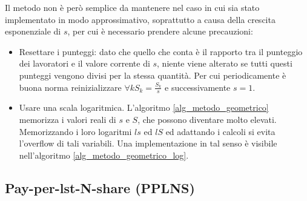 Il metodo non è però semplice da mantenere nel caso in cui sia stato implementato in modo approssimativo, soprattutto a causa della crescita esponenziale di $s$, per cui è necessario prendere alcune precauzioni:
\begin{itemize}
    \item Resettare i punteggi: dato che quello che conta è il rapporto tra il punteggio dei lavoratori e il valore corrente di $s$, niente viene alterato se tutti questi punteggi vengono divisi per la stessa quantità. Per cui periodicamente è buona norma reinizializzare $\forall k S_k = \frac{S_k}{s}$ e successivamente $s=1$.
    \item Usare una scala logaritmica. L'algoritmo \ref{alg_metodo_geometrico} memorizza i valori reali di $s$ e $S$, che possono diventare molto elevati. Memorizzando i loro logaritmi $ls$ ed $lS$ ed adattando i calcoli si evita l'overflow di tali variabili. Una implementazione in tal senso è visibile nell'algoritmo \ref{alg_metodo_geometrico_log}.
\end{itemize}



\subsection{Pay-per-lst-N-share (PPLNS)}

